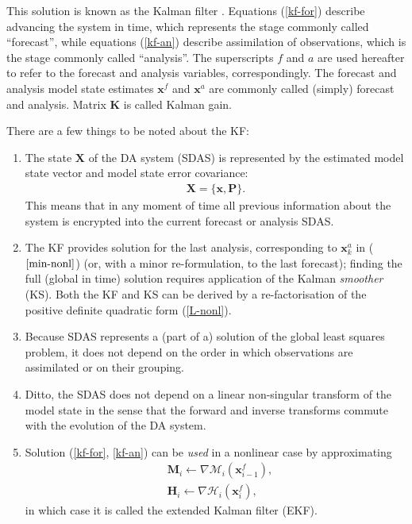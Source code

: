 \documentclass[11pt]{report}
\newcommand{\mb} {\mathbf}
\begin{document}
This solution is known as the Kalman filter \citep[KF,][]{kal60}.
Equations (\ref{kf-for}) describe advancing the system in time, which represents the stage commonly called ``forecast'', while equations (\ref{kf-an}) describe assimilation of observations, which is the stage commonly called ``analysis''.
The superscripts $f$ and $a$ are used hereafter to refer to the forecast and analysis variables, correspondingly.
The forecast and analysis model state estimates $\mb x^f$ and $\mb x^a$ are commonly called (simply) forecast and analysis.
Matrix $\mb K$ is called Kalman gain.

There are a few things to be noted about the KF:
\begin{enumerate}
\item The state $\mb X$ of the DA system (SDAS) is represented by the estimated model state vector and model state error covariance: 
\begin{align}
  \label{sdas}
  \mb X = \{\mb x, \mb P\}.
\end{align}
This means that in any moment of time all previous information about the system is encrypted into the current forecast or analysis SDAS.
\item The KF provides solution for the last analysis, corresponding to $\mb x_k^a$ in ($\ref{min-nonl}$) (or, with a minor re-formulation, to the last forecast); finding the full (global in time) solution requires application of the Kalman \emph{smoother} (KS).
Both the KF and KS can be derived by a re-factorisation of the positive definite quadratic form (\ref{L-nonl}).
\item Because SDAS represents a (part of a) solution of the global least squares problem, it does not depend on the order in which observations are assimilated or on their grouping.
\item Ditto, the SDAS does not depend on a linear non-singular transform of the model state in the sense that the forward and inverse transforms commute with the evolution of the DA system.
\item Solution (\ref{kf-for}, \ref{kf-an}) can be \emph{used} in a nonlinear case by approximating
\begin{align*}
  &\mb M_{i} \leftarrow \nabla \mathcal M_i(\mb x_{i-1}^f),\\
  &\mb H_{i} \leftarrow \nabla \mathcal H_i(\mb x_i^f),
\end{align*}
in which case it is called the extended Kalman filter (EKF).
\end{enumerate}
\end{document}
